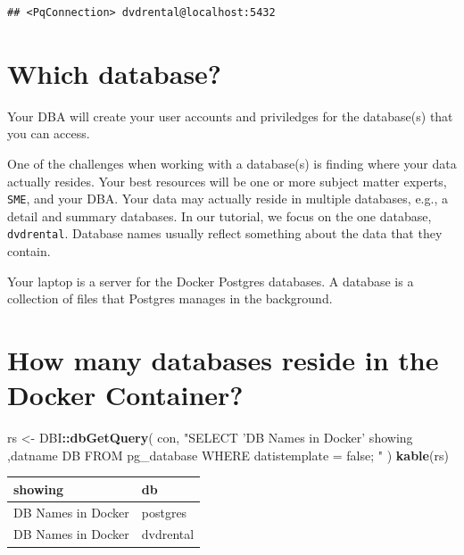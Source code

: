 \documentclass[]{book}
\newenvironment{Shaded}{\begin{snugshade}}{\end{snugshade}}
\newcommand{\KeywordTok}[1]{\textcolor[rgb]{0.13,0.29,0.53}{\textbf{#1}}}
\newcommand{\NormalTok}[1]{#1}
\newcommand{\OperatorTok}[1]{\textcolor[rgb]{0.81,0.36,0.00}{\textbf{#1}}}
\newcommand{\StringTok}[1]{\textcolor[rgb]{0.31,0.60,0.02}{#1}}
\theoremstyle{definition}
\theoremstyle{definition}
\theoremstyle{definition}
\theoremstyle{remark}
\begin{document}
\begin{verbatim}
## <PqConnection> dvdrental@localhost:5432
\end{verbatim}

\hypertarget{which-database}{%
\section{Which database?}\label{which-database}}

Your DBA will create your user accounts and priviledges for the
database(s) that you can access.

One of the challenges when working with a database(s) is finding where
your data actually resides. Your best resources will be one or more
subject matter experts, \texttt{SME}, and your DBA. Your data may
actually reside in multiple databases, e.g., a detail and summary
databases. In our tutorial, we focus on the one database,
\texttt{dvdrental}. Database names usually reflect something about the
data that they contain.

Your laptop is a server for the Docker Postgres databases. A database is
a collection of files that Postgres manages in the background.

\hypertarget{how-many-databases-reside-in-the-docker-container}{%
\section{How many databases reside in the Docker
Container?}\label{how-many-databases-reside-in-the-docker-container}}

\begin{Shaded}
\begin{Highlighting}[]
\NormalTok{rs <-}
\StringTok{  }\NormalTok{DBI}\OperatorTok{::}\KeywordTok{dbGetQuery}\NormalTok{(}
\NormalTok{  con,}
  \StringTok{"SELECT 'DB Names in Docker' showing}
\StringTok{          ,datname DB}
\StringTok{     FROM pg_database}
\StringTok{    WHERE datistemplate = false;}
\StringTok{  "}
\NormalTok{  )}
\KeywordTok{kable}\NormalTok{(rs)}
\end{Highlighting}
\end{Shaded}

\begin{tabular}{l|l}
\hline
showing & db\\
\hline
DB Names in Docker & postgres\\
\hline
DB Names in Docker & dvdrental\\
\hline
\end{tabular}
\end{document}
